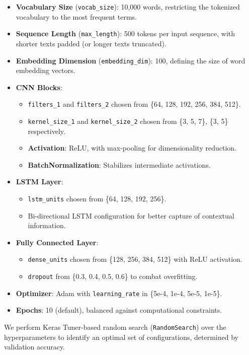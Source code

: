 \begin{itemize}
    \item \textbf{Vocabulary Size} (\texttt{vocab\_size}): 10{,}000 words, restricting the tokenized vocabulary to the most frequent terms.
    \item \textbf{Sequence Length} (\texttt{max\_length}): 500 tokens per input sequence, with shorter texts padded (or longer texts truncated).
    \item \textbf{Embedding Dimension} (\texttt{embedding\_dim}): 100, defining the size of word embedding vectors.
    \item \textbf{CNN Blocks}: 
    \begin{itemize}
        \item \texttt{filters\_1} and \texttt{filters\_2} chosen from \{64, 128, 192, 256, 384, 512\}.
        \item \texttt{kernel\_size\_1} and \texttt{kernel\_size\_2} chosen from \{3, 5, 7\}, \{3, 5\} respectively.
        \item \textbf{Activation}: ReLU, with max-pooling for dimensionality reduction.
        \item \textbf{BatchNormalization}: Stabilizes intermediate activations.
    \end{itemize}
    \item \textbf{LSTM Layer}:
    \begin{itemize}
        \item \texttt{lstm\_units} chosen from \{64, 128, 192, 256\}.
        \item Bi-directional LSTM configuration for better capture of contextual information.
    \end{itemize}
    \item \textbf{Fully Connected Layer}:
    \begin{itemize}
        \item \texttt{dense\_units} chosen from \{128, 256, 384, 512\} with ReLU activation.
        \item \texttt{dropout} from \{0.3, 0.4, 0.5, 0.6\} to combat overfitting.
    \end{itemize}
    \item \textbf{Optimizer}: Adam with \texttt{learning\_rate} in \{5e-4, 1e-4, 5e-5, 1e-5\}.
    \item \textbf{Epochs}: 10 (default), balanced against computational constraints.
\end{itemize}

We perform Keras Tuner-based random search (\texttt{RandomSearch}) over the hyperparameters to identify an optimal set of configurations, determined by validation accuracy.

